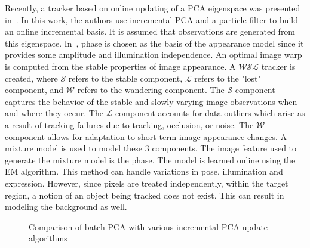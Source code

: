Recently, a tracker based on online updating of a PCA eigenspace was presented in~\cite{2008_JNL_subspaceTRK_Ross}.  In this work, the authors use incremental PCA and a particle filter to build an online incremental basis.  It is assumed that observations are generated from this eigenspace.  In~\cite{2003_JNL_TRKsubspace_Jepson}, phase is chosen as the basis of the appearance model since it provides some amplitude and illumination independence.  An optimal image warp is computed from the stable properties of image appearance.  A $\mathcal{WSL}$ tracker is created, where $\mathcal{S}$ refers to the stable component, $\mathcal{L}$ refers to the "lost" component, and $\mathcal{W}$ refers to the wandering component.  The $\mathcal{S}$ component captures the behavior of the stable and slowly varying image observations when and where they occur.  The $\mathcal{L}$ component accounts for data outliers which arise as a result of tracking failures due to tracking, occlusion, or noise.  The $\mathcal{W}$ component allows for adaptation to short term image appearance changes.  A mixture model is used to model these 3 components.  The image feature used to generate the mixture model is the phase.  The model is learned online using the EM algorithm.  This method can handle variations in pose, illumination and expression.  However, since pixels are treated independently, within the target region, a notion of an object being tracked does not exist.  This can result in modeling the background as well. 

								\begin{figure}[t]
								\centering	
								\caption{Comparison of batch PCA with various incremental PCA update algorithms \cite{2008_JNL_TRKsubs_Skocaj}}
								\label{fig:2008_JNL_TRKsub_Skocaj}				
								\end{figure}

